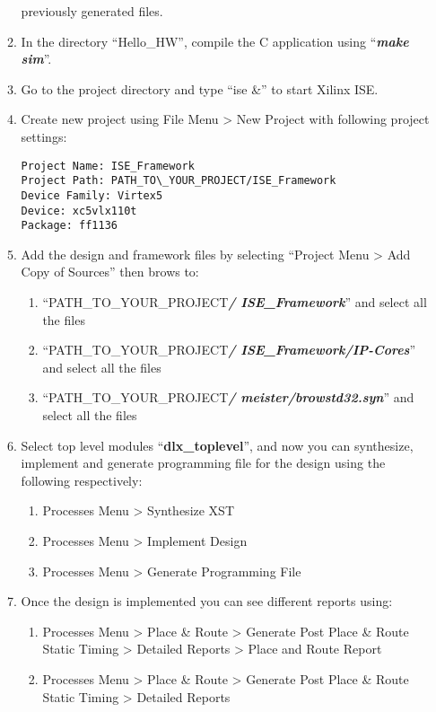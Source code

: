 \begin{enumerate}
\begin{enumerate}
		previously generated files.
		\item
		In the directory ``Hello\_HW'', compile the C application using
		``\emph{\textbf{make sim}}''.
		\item
		Go to the project directory and type ``ise \&'' to start Xilinx ISE.
		\item
		Create new project using File Menu \textgreater{} New Project with
		following project settings:
	\begin{lstlisting}
Project Name: ISE_Framework
Project Path: PATH_TO\_YOUR_PROJECT/ISE_Framework
Device Family: Virtex5
Device: xc5vlx110t
Package: ff1136
	\end{lstlisting}
	\item
	Add the design and framework files by selecting ``Project Menu
	\textgreater{} Add Copy of Sources'' then brows to:
	\begin{enumerate}
		\item
		``PATH\_TO\_YOUR\_PROJECT\emph{\textbf{/ ISE\_Framework}}'' and
		select all the files
		\item
		``PATH\_TO\_YOUR\_PROJECT\emph{\textbf{/ ISE\_Framework/IP-Cores}}''
		and select all the files
		\item
		``PATH\_TO\_YOUR\_PROJECT\emph{\textbf{/
				meister/}}\emph{\textbf{browstd32.syn}}'' and select all the files
	\end{enumerate}
	\item
	Select top level modules ``\textbf{dlx\_toplevel}'', and now you can
	synthesize, implement and generate programming file for the design
	using the following respectively:
	\begin{enumerate}
		\item
		Processes Menu \textgreater{} Synthesize XST
		\item
		Processes Menu \textgreater{} Implement Design
		\item
		Processes Menu \textgreater{} Generate Programming File
	\end{enumerate}
	\item
	Once the design is implemented you can see different reports using:
	\begin{enumerate}
		\item
		Processes Menu \textgreater{} Place \& Route \textgreater{} Generate
		Post Place \& Route Static Timing \textgreater{} Detailed Reports
		\textgreater{} Place and Route Report
		\item
		Processes Menu \textgreater{} Place \& Route \textgreater{} Generate
		Post Place \& Route Static Timing \textgreater{} Detailed Reports

\end{enumerate}
\end{enumerate}
\end{enumerate}
